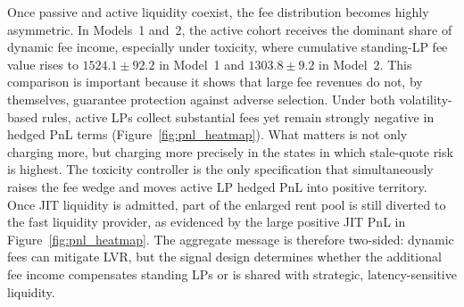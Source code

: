 \documentclass[11pt]{article}
\begin{document}
Once passive and active liquidity coexist, the fee distribution becomes highly asymmetric. In Models~1 and~2, the active 
cohort receives the dominant share of dynamic fee income, especially under toxicity, where cumulative standing-LP fee value 
rises to \(1524.1\pm92.2\) in Model~1 and \(1303.8\pm9.2\) in Model~2. This comparison is important because it shows that 
large fee revenues do not, by themselves, guarantee protection against adverse selection. Under both volatility-based rules, 
active LPs collect substantial fees yet remain strongly negative in hedged PnL terms (Figure~\ref{fig:pnl_heatmap}). What 
matters is not only charging more, but charging more precisely in the states in which stale-quote risk is highest. The 
toxicity controller is the only specification that simultaneously raises the fee wedge and moves active LP hedged PnL into 
positive territory. Once JIT liquidity is admitted, part of the enlarged rent pool is still diverted to the fast liquidity 
provider, as evidenced by the large positive JIT PnL in Figure~\ref{fig:pnl_heatmap}. The aggregate message is therefore 
two-sided: dynamic fees can mitigate LVR, but the signal design determines whether the additional fee income compensates 
standing LPs or is shared with strategic, latency-sensitive liquidity.
\end{document}
